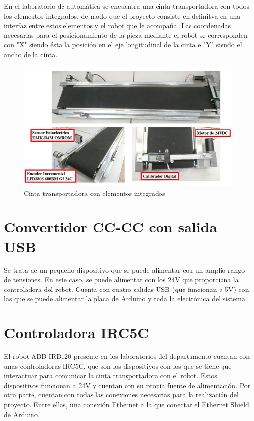 En el laboratorio de automática se encuentra una cinta transportadora con todos los elementos integrados, de modo que el proyecto consiste en definitva en una interfaz entre estos elementos y el robot que le acompaña. Las coordenadas necesarias para el posicionamiento de la pieza mediante el robot se corresponden con "X" siendo ésta la posición en el eje longitudinal de la cinta e "Y" siendo el ancho de la cinta.

\begin{figure}[hbtp]
    \centering
    \includegraphics[width=\textwidth]{02-hardware/10-banda.png}
    \caption{Cinta transportadora con elementos integrados}
    \label{fig:figura210}
    \end{figure}

\section{Convertidor CC-CC con salida USB}

Se trata de un pequeño dispositivo que se puede alimentar con un amplio rango de tensiones. En este caso,
se puede alimentar con los 24V que proporciona la controladora del robot. Cuenta con cuatro salidas USB 
(que funcionan a 5V) con las que se puede alimentar la placa de Arduino y toda la electrónica del sistema.

\section{Controladora IRC5C}

El robot ABB IRB120 presente en los laboratorios del departamento cuentan con unas controladoras IRC5C,
que son los dispositivos con los que se tiene que interactuar para comunicar la cinta transportadora con
el robot. Estos dispositivos funcionan a 24V y cuentan con su propia fuente de alimentación. Por otra parte,
cuentan con todas las conexiones necesarias para la realización del proyecto. Entre ellas, una conexión Ethernet
a la que conectar el Ethernet Shield de Arduino.

